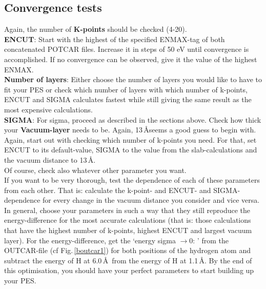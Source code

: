 \documentclass[twoside, 11pt, titlepage, captions=nooneline, a4paper, headsepline]{scrbook}%
\newcommand{\9}{\mathrm}
\newcommand{\0}{\,\mathrm}
\begin{document}
\subsection{Convergence tests}
Again, the number of \textbf{K-points} should be checked (4-20).\\
\textbf{ENCUT}: Start with the highest of the specified ENMAX-tag of both concatenated POTCAR files. Increase it in steps of 50 eV until convergence is accomplished. If no convergence can be observed, give it the value of the highest ENMAX.\\
\textbf{Number of layers}: Either choose the number of layers you would like to have to fit your PES or check which number of layers with which number of k-points, ENCUT and SIGMA calculates fastest while still giving the same result as the most expensive calculations.\\
\textbf{SIGMA}: For sigma, proceed as described in the sections above. Check how thick your \textbf{Vacuum-layer} needs to be. Again, 13\,\AA seems a good guess to begin with.\\
Again, start out with checking which number of k-points you need. For that, set ENCUT to its default-value, SIGMA to the value from the slab-calculations and the vacuum distance to 13\,\AA.\\
Of course, check also whatever other parameter you want.\\
If you want to be very thorough, test the dependence of each of these parameters from each other. That is: calculate the k-point- and ENCUT- and SIGMA-dependence for every change in the vacuum distance you consider and vice versa.\\
In general, choose your parameters in such a way that they still reproduce the energy-difference for the most accurate calculations (that is: those calculations that have the highest number of k-points, highest ENCUT and largest vacuum layer). For the energy-difference, get the `energy sigma $\rightarrow 0$: ' from the OUTCAR-file (cf Fig.\,\ref{boutcar1}) for both positions of the hydrogen atom and subtract the energy of H at 6.0\,\AA~from the energy of H at 1.1\,\AA.
By the end of this optimisation, you should have your perfect parameters to start building up your PES.\\
\end{document}
